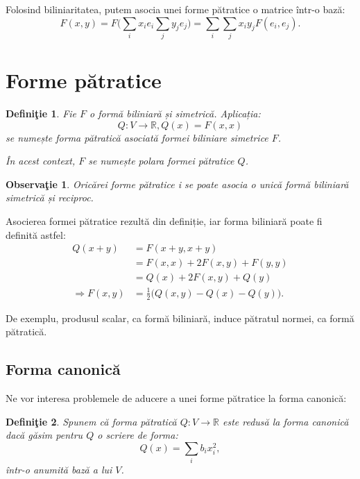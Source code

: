 \documentclass[11pt,a4paper]{article}
\newcommand\RR{\mathbb{R}}
\theoremstyle{dotless}
\theoremstyle{dotlessdr}
\newtheorem{definition}{Defini\c{t}ie}[section]
\newtheorem{remark}{Observa\c{t}ie}[section]
\begin{document}
Folosind biliniaritatea, putem asocia unei forme pătratice o matrice într-o bază:
\[
  F(x, y) = F \Big( \sum_i x_i e_i \sum_j y_j e_j \Big) = %
  \sum_i \sum_j x_i y_j F(e_i, e_j).
\]


\section{Forme pătratice}
\label{sec:f-patr}

\begin{definition}\label{def:f-patr}
  Fie $F$ o formă biliniară și simetrică. Aplicația:
  \[
    Q : V \to \RR, Q(x) = F(x, x)
  \]
  se numește \emph{forma pătratică asociată formei biliniare simetrice $F$}.

  În acest context, $F$ se numește \emph{polara formei pătratice $Q$}.
\end{definition}

\begin{remark}\label{rk:patr-bil}
  Oricărei forme pătratice i se poate asocia o unică formă biliniară simetrică
  și reciproc.
\end{remark}

Asocierea formei pătratice rezultă din definiție, iar forma biliniară poate fi
definită astfel:
\begin{align*}
  Q(x + y) &= F(x + y, x + y) \\
           &= F(x, x) + 2F(x, y) + F(y, y) \\
           &= Q(x) + 2F(x, y) + Q(y) \\
  \Rightarrow F(x, y) &= \frac{1}{2} \big( Q(x, y) - Q(x) - Q(y) \big).
\end{align*}

De exemplu, produsul scalar, ca formă biliniară, induce pătratul normei, ca formă pătratică.


\subsection{Forma canonică}
\label{subsec:f-can}

Ne vor interesa problemele de aducere a unei forme pătratice la forma canonică:

\begin{definition}\label{def:f-can-patr}
  Spunem că forma pătratică $Q : V \to \RR$ este \emph{redusă la forma canonică}
  dacă găsim pentru $Q$ o scriere de forma:
  \[
    Q(x) = \sum_i b_i x_i^2,
  \]
  într-o anumită bază a lui $V$.
\end{definition}
\end{document}
